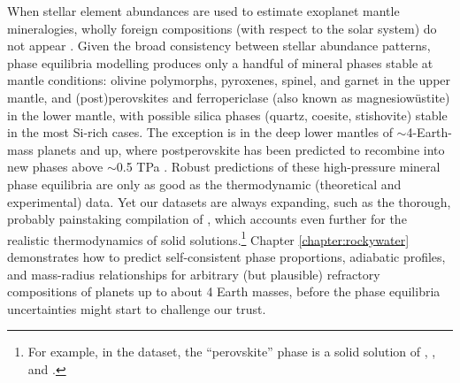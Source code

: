 When stellar element abundances are used to estimate exoplanet mantle mineralogies, wholly foreign compositions (with respect to the solar system) do not appear \citep{hinkel_star_2018, putirka_composition_2019, wang_enhanced_2019, wang_detailed_2022, spaargaren_plausible_2022}. Given the broad consistency between stellar abundance patterns, phase equilibria modelling produces only a handful of mineral phases stable at mantle conditions: olivine polymorphs, pyroxenes, spinel, and garnet in the upper mantle, and (post)perovskites and ferropericlase (also known as magnesiow\"ustite) in the lower mantle, with possible silica phases (quartz, coesite, stishovite) stable in the most Si-rich cases. The exception is in the deep lower mantles of $\sim$4-Earth-mass planets and up, where  postperovskite has been predicted to recombine into new phases above $\sim$0.5 TPa \citep{umemoto_phase_2017}. Robust predictions of these high-pressure mineral phase equilibria are only as good as the thermodynamic (theoretical and experimental) data. Yet our datasets are always expanding, such as the thorough, probably painstaking compilation of \citet{stixrude_thermal_2022}, which accounts even further for the realistic thermodynamics of solid solutions.\footnote{For example, in the \citet{stixrude_thermal_2022} dataset, the ``perovskite'' phase is a solid solution of , , and .} Chapter \ref{chapter:rockywater} demonstrates how to predict self-consistent phase proportions, adiabatic profiles, and mass-radius relationships for arbitrary (but plausible) refractory compositions of planets up to about 4 Earth masses, before the phase equilibria uncertainties might start to challenge our trust.




